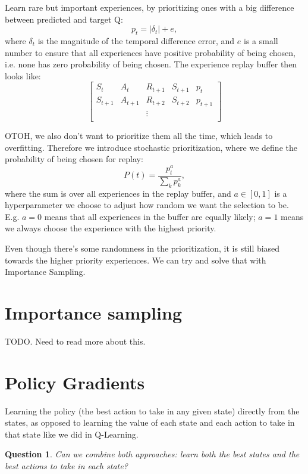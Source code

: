 \documentclass[12pt]{article}
\theoremstyle{plain}
\newtheorem{question}[theorem]{Question}
\theoremstyle{definition}
\theoremstyle{remark}
\begin{document}
Learn rare but important experiences, by prioritizing ones with a big difference between predicted and target Q: $$
p _ { t } = \left| \delta _ { t } \right| + e,
$$
where $ \delta_t $ is the magnitude of the temporal difference error, and $ e $ is a small number to ensure that all experiences have positive probability of being chosen, i.e. none has zero probability of being chosen. The experience replay buffer then looks like: $$
\begin{bmatrix}
S_t & A_t & R_{t+1} & S_{t+1} & p_t \\
S_{t+1} & A_{t+1} & R_{t+2} & S_{t+2} & p_{t+1} \\
& & \vdots & & \\
\end{bmatrix}
$$

OTOH, we also don't want to prioritize them all the time, which leads to overfitting. Therefore we introduce stochastic prioritization, where we define the probability of being chosen for replay: $$
P(t) = \frac{p_t^a}{\sum_k p_k^a},
$$
where the sum is over all experiences in the replay buffer, and $ a \in [0, 1] $ is a hyperparameter we choose to adjust how random we want the selection to be. E.g. $ a = 0 $ means that all experiences in the buffer are equally likely; $ a = 1 $ means we always choose the experience with the highest priority.

Even though there's some randomness in the prioritization, it is still biased towards the higher priority experiences. We can try and solve that with Importance Sampling.

\section{Importance sampling}

TODO. Need to read more about this.


\section{Policy Gradients}

Learning the policy (the best action to take in any given state) directly from the states, as opposed to learning the value of each state and each action to take in that state like we did in Q-Learning.

\begin{question}
  Can we combine both approaches: learn both the best states and the best actions to take in each state?
\end{question}
\end{document}
